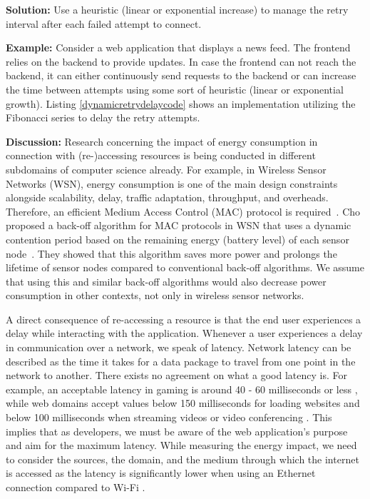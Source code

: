 \textbf{Solution:} Use a heuristic (\eg linear or exponential increase) to manage the retry interval after each failed attempt to connect.

\textbf{Example:} Consider a web application that displays a news feed. The frontend relies on the backend to provide updates. In case the frontend can not reach the backend, it can either continuously send requests to the backend or can increase the time between attempts using some sort of heuristic (\eg linear or exponential growth).  Listing \ref{dynamicretrydelaycode} shows an implementation utilizing the Fibonacci series to delay the retry attempts.



\textbf{Discussion:} Research concerning the impact of energy consumption in connection with (re-)accessing resources is being conducted in different subdomains of computer science already. For example, in Wireless Sensor Networks (WSN), energy consumption is one of the main design constraints alongside scalability, delay, traffic adaptation, throughput, and overheads. Therefore, an efficient Medium Access Control (MAC) protocol is required~\cite{Kaur2016}. Cho \etal proposed a back-off algorithm for MAC protocols in WSN that uses a dynamic contention period based on the remaining energy (\ie battery level) of each sensor node~\cite{Cho2006}. They showed that this algorithm saves more power and prolongs the lifetime of sensor nodes compared to conventional back-off algorithms. We assume that using this and similar back-off algorithms would also decrease power consumption in other contexts, not only in wireless sensor networks.

A direct consequence of re-accessing a resource is that the end user experiences a delay while interacting with the application. Whenever a user experiences a delay in communication over a network, we speak of latency. Network latency can be described as the time it takes for a data package to travel from one point in the network to another.  There exists no agreement on what a good latency is. For example, an acceptable latency in gaming is around 40 - 60 milliseconds or less \cite{gaming_latency},
 while web domains accept values below 150 milliseconds for loading websites \cite{website_latency}
and below 100 milliseconds
when streaming videos or video conferencing \cite{latency-video}. This implies that as developers, we must be aware of the web application's purpose and aim for the maximum latency. While measuring the energy impact, we need to consider the sources, the domain, and the medium through which the internet is accessed as the latency is significantly lower when using an Ethernet connection compared to Wi-Fi \cite{ethernet-vs-wifi}. 

